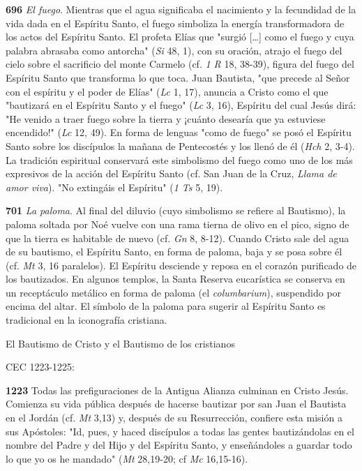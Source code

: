 \documentclass[]{article}
\begin{document}
\textbf{696} \emph{El fuego}. Mientras que el agua significaba el
nacimiento y la fecundidad de la vida dada en el Espíritu Santo, el
fuego simboliza la energía transformadora de los actos del Espíritu
Santo. El profeta Elías que "surgió [\ldots{}] como el fuego y cuya
palabra abrasaba como antorcha" (\emph{Si} 48, 1), con su oración,
atrajo el fuego del cielo sobre el sacrificio del monte Carmelo (cf.
\emph{1 R} 18, 38-39), figura del fuego del Espíritu Santo que
transforma lo que toca. Juan Bautista, "que precede al Señor con el
espíritu y el poder de Elías" (\emph{Lc} 1, 17), anuncia a Cristo como
el que "bautizará en el Espíritu Santo y el fuego" (\emph{Lc} 3, 16),
Espíritu del cual Jesús dirá: "He venido a traer fuego sobre la tierra y
¡cuánto desearía que ya estuviese encendido!" (\emph{Lc} 12, 49). En
forma de lenguas "como de fuego" se posó el Espíritu Santo sobre los
discípulos la mañana de Pentecostés y los llenó de él (\emph{Hch} 2,
3-4). La tradición espiritual conservará este simbolismo del fuego como
uno de los más expresivos de la acción del Espíritu Santo (cf. San Juan
de la Cruz, \emph{Llama de amor viva}). "No extingáis el Espíritu"
(\emph{1 Ts} 5, 19).

\textbf{701} \emph{La paloma}. Al final del diluvio (cuyo simbolismo se
refiere al Bautismo), la paloma soltada por Noé vuelve con una rama
tierna de olivo en el pico, signo de que la tierra es habitable de nuevo
(cf. \emph{Gn} 8, 8-12). Cuando Cristo sale del agua de su bautismo, el
Espíritu Santo, en forma de paloma, baja y se posa sobre él (cf.
\emph{Mt} 3, 16 paralelos). El Espíritu desciende y reposa en el corazón
purificado de los bautizados. En algunos templos, la Santa Reserva
eucarística se conserva en un receptáculo metálico en forma de paloma
(el \emph{columbarium}), suspendido por encima del altar. El símbolo de
la paloma para sugerir al Espíritu Santo es tradicional en la
iconografía cristiana.

El Bautismo de Cristo y el Bautismo de los cristianos

CEC 1223-1225:

\textbf{1223} Todas las prefiguraciones de la Antigua Alianza culminan
en Cristo Jesús. Comienza su vida pública después de hacerse bautizar
por san Juan el Bautista en el Jordán (cf. \emph{Mt} 3,13) y, después de
su Resurrección, confiere esta misión a sus Apóstoles: "Id, pues, y
haced discípulos a todas las gentes bautizándolas en el nombre del Padre
y del Hijo y del Espíritu Santo, y enseñándoles a guardar todo lo que yo
os he mandado" (\emph{Mt} 28,19-20; cf \emph{Mc} 16,15-16).
\end{document}
